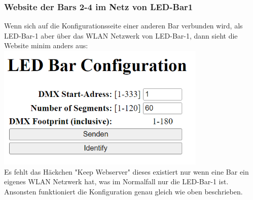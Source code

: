 \documentclass{article}
\begin{document}
\subsubsection{Website der Bars 2-4 im Netz von LED-Bar1}
Wenn sich auf die Konfigurationsseite einer anderen Bar verbunden wird, als LED-Bar-1 aber über das WLAN Netzwerk von LED-Bar-1, dann sieht die Website minim anders aus:\\
\includegraphics[width = 10cm]{Website_Non_Main_AP}\\ 
Es fehlt das Häckchen "Keep Webserver" dieses existiert nur wenn eine Bar ein eigenes WLAN Netzwerk hat, was im Normalfall nur die LED-Bar-1 ist. Ansonsten funktioniert die Konfiguration genau gleich wie oben beschrieben. 
\end{document}
